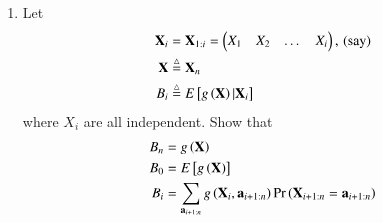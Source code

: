 \documentclass[journal,12pt,twocolumn]{IEEEtran}
\renewcommand\thesection{\arabic{section}}
\begin{document}
\begin{enumerate}[label=\thesection.\arabic*,ref=\thesection.\theenumi]
\item Let 
\begin{align}
\mathbf{X}_i &= \mathbf{X}_{1:i}=\begin{pmatrix}X_1 & X_2 & \dots & X_i\end{pmatrix},\, \text{(say)}
\\
\mathbf{X} &\stackrel{\triangle}{=} \mathbf{X}_n 
\\
B_i &\stackrel{\triangle}{=} E{}\left[g\left(\mathbf{X}\right) |\mathbf{X}_i\right]
\end{align}
where $X_i$ are all independent.
Show that
\begin{align}
B_n &= g\left(\mathbf{X}\right)
\\
B_0 &= E{}\left[g\left(\mathbf{X}\right)\right]
\\
B_i &= \sum_{\mathbf{a}_{i+1:n}}g\left(\mathbf{X}_{i},\mathbf{a}_{i+1:n}\right)\Pr\left(\mathbf{X}_{i+1:n} = \mathbf{a}_{i+1:n}\right)
\end{align}


\end{enumerate}
\end{document}
